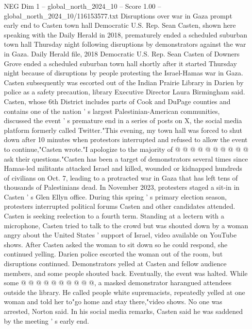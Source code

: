 \begin{textsample}{NEG Dim 1 – global\_north\_2024\_10 – Score 1.00 – global\_north\_2024\_10/116153577.txt}  \label{ex:f1_neg_375}
Disruptions over war in Gaza prompt early end to Casten town hall Democratic U.S.
Rep.
Sean Casten, shown here speaking with the Daily Herald in 2018, prematurely ended a scheduled suburban town hall Thursday night following disruptions by demonstrators against the war in Gaza.
Daily Herald file, 2018 Democratic U.S.
Rep.
Sean Casten of Downers Grove ended a scheduled suburban town hall shortly after it started Thursday night because of disruptions by people protesting the Israel-Hamas war in Gaza.
Casten subsequently was escorted out of the Indian Prairie Library in Darien by police as a safety precaution, library Executive Director Laura Birmingham said.
Casten, whose 6th District includes parts of Cook and DuPage counties and contains one of the nation ' s largest Palestinian-American communities, discussed the event ' s premature end in a series of posts on X, the social media platform formerly called Twitter."This evening, my town hall was forced to shut down after 10 minutes when protestors interrupted and refused to allow the event to continue,"Casten wrote."I apologize to the majority of @ @ @ @ @ @ @ @ @ @ ask their questions."Casten has been a target of demonstrators several times since Hamas-led militants attacked Israel and killed, wounded or kidnapped hundreds of civilians on Oct. 7, leading to a protracted war in Gaza that has left tens of thousands of Palestinians dead.
In November 2023, protesters staged a sit-in in Casten ' s Glen Ellyn office.
During this spring ' s primary election season, protesters interrupted political forums Casten and other candidates attended.
Casten is seeking reelection to a fourth term.
Standing at a lectern with a microphone, Casten tried to talk to the crowd but was shouted down by a woman angry about the United States ' support of Israel, video available on YouTube shows.
After Casten asked the woman to sit down so he could respond, she continued yelling.
Darien police escorted the woman out of the room, but disruptions continued.
Demonstrators yelled at Casten and fellow audience members, and some people shouted back.
Eventually, the event was halted.
While some @ @ @ @ @ @ @ @ @ @, a masked demonstrator harangued attendees outside the library.
He called people white supremacists, repeatedly yelled at one woman and told her to"go home and stay there,"video shows.
No one was arrested, Norton said.
In his social media remarks, Casten said he was saddened by the meeting ' s early end.

\end{textsample}
